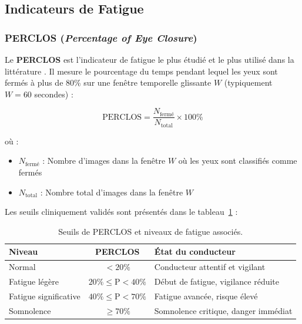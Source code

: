 \documentclass[12pt,a4paper,twoside]{report}
\newcommand{\keyword}[1]{\textbf{\textcolor{stellantisblue}{#1}}}
\begin{document}
\subsection{Indicateurs de Fatigue}

\subsubsection{PERCLOS (\textit{Percentage of Eye Closure})}

Le \keyword{PERCLOS} est l'indicateur de fatigue le plus étudié et le plus utilisé dans la littérature \cite{wierwille1994}. Il mesure le pourcentage du temps pendant lequel les yeux sont fermés à plus de 80\% sur une fenêtre temporelle glissante $W$ (typiquement $W = 60$ secondes) :

\begin{equation}
\boxed{
\text{PERCLOS} = \frac{N_{\text{fermé}}}{N_{\text{total}}} \times 100\%
}
\label{eq:perclos}
\end{equation}

où :
\begin{itemize}
    \item $N_{\text{fermé}}$ : Nombre d'images dans la fenêtre $W$ où les yeux sont classifiés comme fermés
    \item $N_{\text{total}}$ : Nombre total d'images dans la fenêtre $W$
\end{itemize}

Les seuils cliniquement validés sont présentés dans le tableau~\ref{tab:perclos_seuils} :

\begin{table}[H]
\centering
\caption{Seuils de PERCLOS et niveaux de fatigue associés.}
\label{tab:perclos_seuils}
\renewcommand{\arraystretch}{1.3}
\begin{tabular}{|l|c|l|}
\hline
\rowcolor{stellantisblue!15}
\textbf{Niveau} & \textbf{PERCLOS} & \textbf{État du conducteur} \\
\hline
Normal & $< 20\%$ & Conducteur attentif et vigilant \\
\hline
\rowcolor{alertyellow!30}
Fatigue légère & $20\% \leq \text{P} < 40\%$ & Début de fatigue, vigilance réduite \\
\hline
\rowcolor{alertorange!30}
Fatigue significative & $40\% \leq \text{P} < 70\%$ & Fatigue avancée, risque élevé \\
\hline
\rowcolor{alertred!30}
Somnolence & $\geq 70\%$ & Somnolence critique, danger immédiat \\
\hline
\end{tabular}
\end{table}
\end{document}
